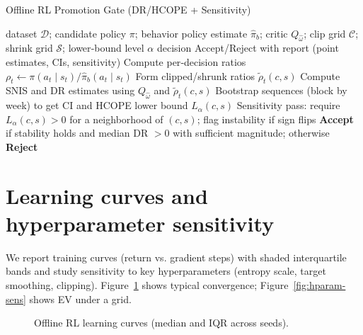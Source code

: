 \begin{algorithm}[t]
  \caption{Offline RL Promotion Gate (DR/HCOPE + Sensitivity)}
  \label{alg:ope-gate}
  \begin{algorithmic}[1]
    \Require dataset $\mathcal D$; candidate policy $\pi$; behavior policy estimate $\hat\pi_b$; critic $Q_{\hat\omega}$; clip grid $\mathcal C$; shrink grid $\mathcal S$; lower‑bound level $\alpha$
    \Ensure decision Accept/Reject with report (point estimates, CIs, sensitivity)
    \State Compute per‑decision ratios $\rho_t\leftarrow\pi(a_t\mid s_t)/\hat\pi_b(a_t\mid s_t)$
      \State Form clipped/shrunk ratios $\tilde\rho_t(c,s)$
      \State Compute SNIS and DR estimates using $Q_{\hat\omega}$ and $\tilde\rho_t(c,s)$
      \State Bootstrap sequences (block by week) to get CI and HCOPE lower bound $L_{\alpha}(c,s)$
    \EndFor
    \State Sensitivity pass: require $L_{\alpha}(c,s)>0$ for a neighborhood of $(c,s)$; flag instability if sign flips
    \State \textbf{Accept} if stability holds and median DR $>0$ with sufficient magnitude; otherwise \textbf{Reject}
  \end{algorithmic}
\end{algorithm}

\section{Learning curves and hyperparameter sensitivity}
We report training curves (return vs. gradient steps) with shaded interquartile bands and study sensitivity to key hyperparameters (entropy scale, target smoothing, clipping). Figure~\ref{fig:rl-curves} shows typical convergence; Figure~\ref{fig:hparam-sens} shows EV under a grid.
\begin{figure}[t]
  \centering
  \caption{Offline RL learning curves (median and IQR across seeds).}
  \label{fig:rl-curves}
\end{figure}

